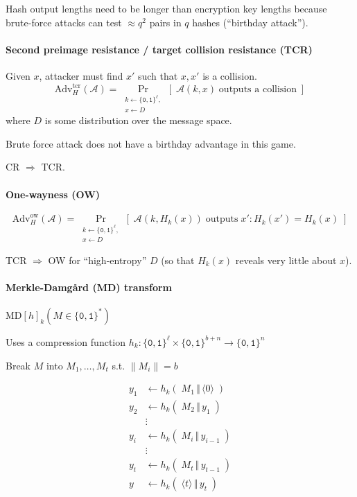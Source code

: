 \documentclass[11pt]{article}
\newcommand{\bit}{\ensuremath{\{\texttt{0},\texttt{1}\}}}
\newcommand{\ang}[1]{\ensuremath{\langle#1\rangle}}
\theoremstyle{remark}
\begin{document}
Hash output lengths need to be longer than encryption key lengths
because brute-force attacks can test $\approx q^2$ pairs in $q$ hashes
(``birthday attack'').

\paragraph{Second preimage resistance / target collision resistance (TCR)}
Given $x$, attacker must find $x'$ such that $x,x'$ is a collision.
\[ \text{Adv}_H^\text{tcr}(\mathcal{A}) =
\Pr_{\substack{k\leftarrow\bit^\ell,\\x\leftarrow D}}
\left[\;\mathcal{A}(k, x)\;\text{outputs a collision}\;\right] \]
where $D$ is some distribution over the message space.

Brute force attack does not have a birthday advantage in this game.

CR $\Rightarrow$ TCR.

\paragraph{One-wayness (OW)}

\[ \text{Adv}_H^\text{ow}(\mathcal{A}) =
\Pr_{\substack{k\leftarrow\bit^\ell,\\x\leftarrow D}}
\left[\;\mathcal{A}(k, H_k(x))\;\text{outputs}\;x':H_k(x')=H_k(x)\;\right] \]

TCR $\Rightarrow$ OW for ``high-entropy'' $D$
(so that $H_k(x)$ reveals very little about $x$).

\paragraph{Merkle-Damg{\aa}rd (MD) transform}
$\text{MD}[h]_k(M\in\bit^*)$

Uses a compression function $h_k:\bit^\ell\times\bit^{b+n}\rightarrow\bit^n$

Break $M$ into $M_1,\ldots,M_t$ s.t. $\|M_i\|=b$

\begin{align*}
y_1 &\leftarrow h_k(\;M_1\,\Vert\,\ang{0}\;) \\
y_2 &\leftarrow h_k(\;M_2\,\Vert\,y_1\;) \\
&\vdots\\
y_i &\leftarrow h_k(\;M_i\,\Vert\,y_{i-1}\;) \\
&\vdots\\
y_t &\leftarrow h_k(\;M_t\,\Vert\,y_{t-1}\;) \\
y &\leftarrow h_k(\;\ang{t}\,\Vert\,y_t\;)
\end{align*}
\end{document}
